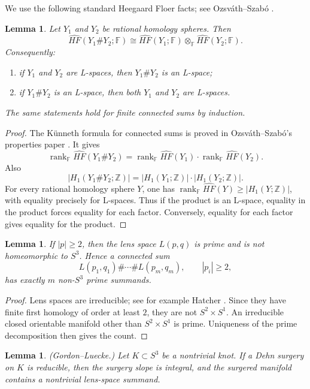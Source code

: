 \documentclass[12pt]{article}
\newtheorem{lemma}[theorem]{Lemma}
\theoremstyle{definition}
\newcommand{\Z}{\mathbb Z}
\newcommand{\F}{\mathbb F}
\newcommand{\HFhat}{\widehat{HF}}
\DeclareMathOperator{\rank}{rank}
\begin{document}
We use the following standard Heegaard Floer facts; see Ozsváth--Szabó \cite{OSz,OSzProp}.

\begin{lemma}\label{lem:kunneth-lspace}
Let \(Y_1\) and \(Y_2\) be rational homology spheres.  Then
\[
\HFhat(Y_1\# Y_2;\F)\cong \HFhat(Y_1;\F)\otimes_{\F}\HFhat(Y_2;\F).
\]
Consequently:
\begin{enumerate}
  \item if \(Y_1\) and \(Y_2\) are L-spaces, then \(Y_1\# Y_2\) is an L-space;
  \item if \(Y_1\# Y_2\) is an L-space, then both \(Y_1\) and \(Y_2\) are L-spaces.
\end{enumerate}
The same statements hold for finite connected sums by induction.
\end{lemma}

\begin{proof}
The Künneth formula for connected sums is proved in Ozsváth--Szabó's properties paper \cite{OSzProp}.  It gives
\[
\rank_{\F}\HFhat(Y_1\#Y_2)=
\rank_{\F}\HFhat(Y_1)\cdot \rank_{\F}\HFhat(Y_2).
\]
Also
\[
|H_1(Y_1\#Y_2;\Z)|=
|H_1(Y_1;\Z)|\cdot |H_1(Y_2;\Z)|.
\]
For every rational homology sphere \(Y\), one has \(\rank_{\F}\HFhat(Y)\ge |H_1(Y;\Z)|\), with equality precisely for L-spaces.  Thus if the product is an L-space, equality in the product forces equality for each factor.  Conversely, equality for each factor gives equality for the product.
\end{proof}

\begin{lemma}\label{lem:lens-prime}
If \(|p|\ge 2\), then the lens space \(L(p,q)\) is prime and is not homeomorphic to \(S^3\).  Hence a connected sum
\[
L(p_1,q_1)\#\cdots\# L(p_m,q_m),
\qquad |p_i|\ge 2,
\]
has exactly \(m\) non-\(S^3\) prime summands.
\end{lemma}

\begin{proof}
Lens spaces are irreducible; see for example Hatcher \cite{Hatcher}.  Since they have finite first homology of order at least \(2\), they are not \(S^2\times S^1\).  An irreducible closed orientable manifold other than \(S^2\times S^1\) is prime.  Uniqueness of the prime decomposition then gives the count.
\end{proof}

\begin{lemma}\label{lem:gordon-luecke}
(Gordon--Luecke.)  Let \(K\subset S^3\) be a nontrivial knot.  If a Dehn surgery on \(K\) is reducible, then the surgery slope is integral, and the surgered manifold contains a nontrivial lens-space summand.
\end{lemma}
\end{document}
